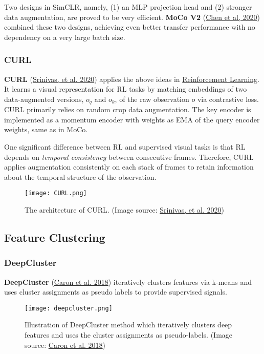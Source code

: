 \documentclass[12pt]{article}
\begin{document}
Two designs in SimCLR, namely, (1) an MLP projection head and (2) stronger data augmentation, are proved to be very efficient. \textbf{MoCo V2} (\href{https://arxiv.org/abs/2003.04297}{Chen et al, 2020}) combined these two designs, achieving even better transfer performance with no dependency on a very large batch size.

\subsubsection{CURL}
\textbf{CURL} (\href{https://arxiv.org/abs/2004.04136}{Srinivas, et al. 2020}) applies the above ideas in \href{https://lilianweng.github.io/posts/2018-02-19-rl-overview/}{Reinforcement Learning}. It learns a visual representation for RL tasks by matching embeddings of two data-augmented versions, $o_q$ and $o_k$, of the raw observation $o$ via contrastive loss. CURL primarily relies on random crop data augmentation. The key encoder is implemented as a momentum encoder with weights as EMA of the query encoder weights, same as in MoCo.

One significant difference between RL and supervised visual tasks is that RL depends on \emph{temporal consistency} between consecutive frames. Therefore, CURL applies augmentation consistently on each stack of frames to retain information about the temporal structure of the observation.

\begin{figure}[H]
    \centering
    \texttt{[image: CURL.png]}
    \caption{The architecture of CURL. (Image source: \href{https://arxiv.org/abs/2004.04136}{Srinivas, et al. 2020})}
\end{figure}

\subsection{Feature Clustering}

\subsubsection{DeepCluster}
\textbf{DeepCluster} (\href{https://arxiv.org/abs/1807.05520}{Caron et al. 2018}) iteratively clusters features via k-means and uses cluster assignments as pseudo labels to provide supervised signals.

\begin{figure}[H]
    \centering
    \texttt{[image: deepcluster.png]}
    \caption{Illustration of DeepCluster method which iteratively clusters deep features and uses the cluster assignments as pseudo-labels. (Image source: \href{https://arxiv.org/abs/1807.05520}{Caron et al. 2018})}
\end{figure}
\end{document}
